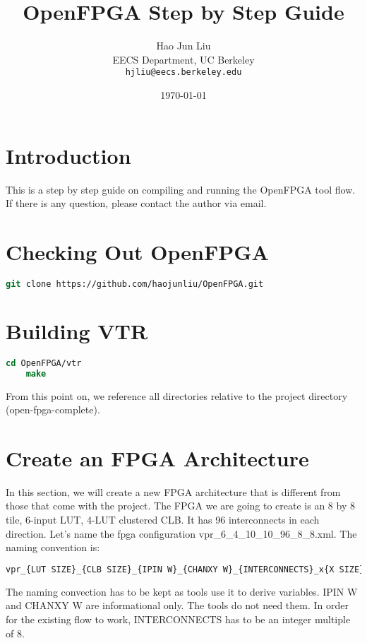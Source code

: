 \documentclass[10pt]{article}
\title{OpenFPGA Step by Step Guide}
\author{Hao Jun Liu\\
EECS Department, UC Berkeley\\
{\tt  hjliu@eecs.berkeley.edu}
}
\date{\today}
\begin{document}
\maketitle{}

\section{Introduction}

This is a step by step guide on compiling and running the OpenFPGA tool flow. If there is any question, please contact
the author via email.

\section{Checking Out OpenFPGA}
\begin{lstlisting}[language=csh]
    git clone https://github.com/haojunliu/OpenFPGA.git
\end{lstlisting}

\section{Building VTR}
\begin{lstlisting}[language=csh]
    cd OpenFPGA/vtr
    make
\end{lstlisting}

\noindent
From this point on, we reference all directories relative to the project directory (open-fpga-complete).
\newline

\section{Create an FPGA Architecture}

In this section, we will create a new FPGA architecture that is different from those that come with the project.
The FPGA we are going to create is an 8 by 8 tile, 6-input LUT, 4-LUT clustered CLB. It has 96 interconnects 
in each direction. Let's name the fpga configuration vpr\_6\_4\_10\_10\_96\_8\_8.xml. The naming convention is:


\begin{lstlisting}[language=csh]
    vpr_{LUT SIZE}_{CLB SIZE}_{IPIN W}_{CHANXY W}_{INTERCONNECTS}_x{X SIZE}_y{Y SIZE}.xml 
\end{lstlisting}  

\noindent    
The naming convection has to be kept as tools use it to derive variables. IPIN W and CHANXY W are informational only.
The tools do not need them. In order for the existing flow to work, INTERCONNECTS has to be an integer multiple of 8.
\end{document}
